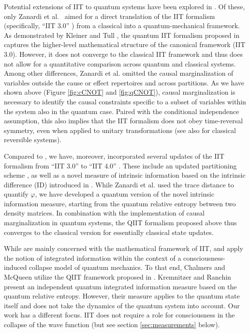 \documentclass[preprints, article, accept, pdftex, moreauthors, letterpaper]{Definitions/mdpi}
\renewcommand{\=}[1]{\stackrel{#1}{=}} %
\renewcommand{\*}{\otimes}%
\begin{document}
Potential extensions of IIT to quantum systems have been explored in \cite{Tegmark2015, Kremnizer2015, Zanardi2018, Kleiner2021, Chalmers2021}. Of these, only Zanardi et al.~\cite{Zanardi2018} aimed for a direct translation of the IIT formalism (specifically, ``IIT 3.0'' \cite{Oizumi2014}) from a classical into a quantum-mechanical framework. 
As demonstrated by Kleiner and Tull \cite{Kleiner2021}, the quantum IIT formalism proposed in \cite{Zanardi2018} captures the higher-level mathematical structure of the canonical framework (IIT 3.0). However, it does not converge to the classical IIT framework and thus does not allow for a quantitative comparison across quantum and classical systems.
Among other differences, Zanardi et al. omitted the causal marginalization of variables outside the cause or effect repertoires and across partitions. As we have shown above (Figure \ref{fig:cCNOT} and \ref{fig:qCNOT}), causal marginalization is necessary to identify the causal constraints specific to a subset of variables within the system also in the quantum case. 
Paired with the conditional independence assumption, this also implies that the IIT formalism does not obey time-reversal symmetry, even when applied to unitary transformations (see also \cite{Albantakis2019cc} for classical reversible systems).

Compared to \cite{Zanardi2018}, we have, moreover, incorporated several updates of the IIT formalism from ``IIT 3.0'' \cite{Oizumi2014} to ``IIT 4.0'' \cite{Barbosa2021, Albantakis2022_4_0}. These include an updated partitioning scheme \cite{Albantakis2019, Barbosa2021}, as well as a novel measure of intrinsic information based on the intrinsic difference (ID) introduced in \cite{Barbosa2020}. While Zanardi et al. \cite{Zanardi2018} used the trace distance to quantify $\varphi$, we have developed a quantum version of the novel intrinsic information measure, starting from the quantum relative entropy between two density matrices. 
In combination with the implementation of causal marginalization in quantum systems, the QIIT formalism proposed above thus converges to the classical version for essentially classical state updates.

While \cite{Zanardi2018, Kleiner2021} are mainly concerned with the mathematical framework of IIT, \cite{Kremnizer2015} and \cite{Chalmers2021} apply the notion of integrated information within the context of a consciousness-induced collapse model of quantum mechanics. To that end, Chalmers and McQueen \cite{Chalmers2021} utilize the QIIT framework proposed in \cite{Zanardi2018}. Kremnitzer and Ranchin \cite{Kremnizer2015} present an independent quantum integrated information measure based on the quantum relative entropy. However, their measure applies to the quantum state itself and does not take the dynamics of the quantum system into account.
Our work has a different focus. IIT does not require a role for consciousness in the collapse of the wave function (but see section \ref{sec:measurements} below).
\end{document}
